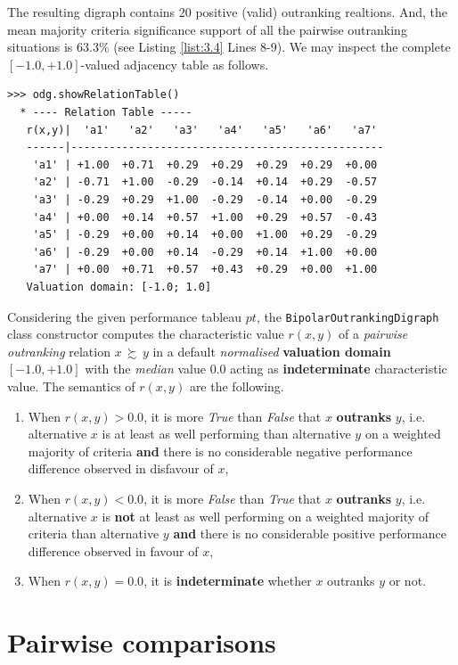 The resulting digraph contains 20 positive (valid) outranking realtions. And, the mean majority criteria significance support of all the pairwise outranking situations is $63.3\%$ (see Listing \ref{list:3.4}  Lines 8-9). We may inspect the complete $[-1.0,+1.0]$-valued adjacency table as follows.
 \begin{lstlisting}[caption={Inspecting the valued adjacency table},label=list:3.5]
>>> odg.showRelationTable()
  * ---- Relation Table -----
   r(x,y)|  'a1'   'a2'   'a3'   'a4'   'a5'   'a6'   'a7'   
   ------|-------------------------------------------------
    'a1' | +1.00  +0.71  +0.29  +0.29  +0.29  +0.29  +0.00  
    'a2' | -0.71  +1.00  -0.29  -0.14  +0.14  +0.29  -0.57  
    'a3' | -0.29  +0.29  +1.00  -0.29  -0.14  +0.00  -0.29  
    'a4' | +0.00  +0.14  +0.57  +1.00  +0.29  +0.57  -0.43  
    'a5' | -0.29  +0.00  +0.14  +0.00  +1.00  +0.29  -0.29  
    'a6' | -0.29  +0.00  +0.14  -0.29  +0.14  +1.00  +0.00  
    'a7' | +0.00  +0.71  +0.57  +0.43  +0.29  +0.00  +1.00  
   Valuation domain: [-1.0; 1.0]
\end{lstlisting}

Considering the given performance tableau $pt$, the \texttt{BipolarOutrankingDigraph} class constructor computes the characteristic value $r(x,y)$ of a \emph{pairwise outranking} relation $x\, \succsim \,y$ \citep{BIS-2013, ADT-L7} in a default {\em normalised\/} {\bf valuation domain} $[-1.0,+1.0]$ with the {\em median\/} value $0.0$ acting as {\bf indeterminate} characteristic value. The semantics of $r(x,y)$ are the following.
\begin{enumerate}
\item When $r(x,y) > 0.0$, it is more {\em True\/} than {\em False\/} that $x$ {\bf outranks} $y$, i.e. alternative $x$ is at least as well performing than alternative $y$ on a weighted majority of criteria {\bf and} there is no considerable negative performance difference observed in disfavour of $x$,
\item When $r(x,y) < 0.0$, it is more {\em False\/} than {\em True\/} that $x$ {\bf outranks} $y$, i.e. alternative $x$ is {\bf not} at least as well performing on a weighted majority of criteria than alternative $y$ {\bf and} there is no considerable positive performance difference observed in favour of $x$,
\item When $r(x,y) = 0.0$, it is {\bf indeterminate} whether $x$ outranks $y$ or not.
\end{enumerate}

\section{Pairwise comparisons}
\label{sec:3.3}

